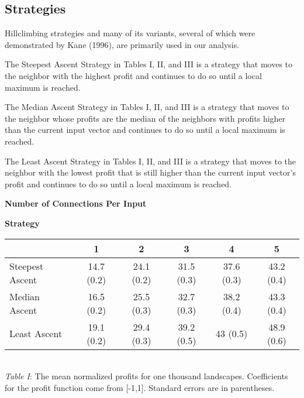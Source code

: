 \subsection{Strategies}\label{strategies}

Hillclimbing strategies and many of its variants, several of which were
demonstrated by Kane (1996), are primarily used in our analysis.

The Steepest Ascent Strategy in Tables I, II, and III is a strategy that
moves to the neighbor with the highest profit and continues to do so
until a local maximum is reached.

The Median Ascent Strategy in Tables I, II, and III is a strategy that
moves to the neighbor whose profits are the median of the neighbors with
profits higher than the current input vector and continues to do so
until a local maximum is reached.

The Least Ascent Strategy in Tables I, II, and III is a strategy that
moves to the neighbor with the lowest profit that is still higher than
the current input vector's profit and continues to do so until a local
maximum is reached.

\begin{center}
\hspace{2cm} \textbf{Number of Connections Per Input}
\begin{flushleft}
\hspace{2.5cm} \textbf{Strategy}
\end{flushleft}
\begin{Schunk}

\begin{tabular}{l|c|c|c|c|c}
\hline
  & 1 & 2 & 3 & 4 & 5\\
\hline
Steepest Ascent & 14.7 (0.2) & 24.1 (0.2) & 31.5 (0.3) & 37.6 (0.3) & 43.2 (0.4)\\
\hline
Median Ascent & 16.5 (0.2) & 25.5 (0.3) & 32.7 (0.3) & 38.2 (0.4) & 43.3 (0.4)\\
\hline
Least Ascent & 19.1 (0.2) & 29.4 (0.3) & 39.2 (0.5) & 43 (0.5) & 48.9 (0.6)\\
\hline
\end{tabular}

\end{Schunk}
\\
\emph{Table I}: The mean normalized profits for one thousand landscapes. Coefficients for the profit function come from [-1,1]. Standard errors are in parentheses.
\end{center}

